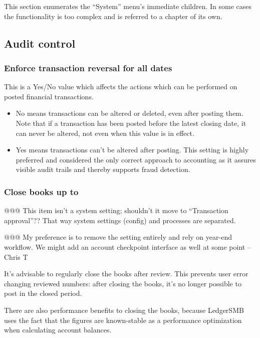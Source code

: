 This section enumerates the ``System'' menu's immediate children. In some cases the
functionality is too complex and is referred to a chapter of its own.

\subsection{Audit control}
\label{subsec-company-config-audit-control}

\subsubsection{Enforce transaction reversal for all dates}
\label{subsubsec-company-config-audit-control-reversals}


This is a Yes/No value which affects the actions which can be performed on posted financial transactions.
\begin{itemize}
\item No means transactions can be altered or deleted, even after posting them. Note that
if a transaction has been posted before the latest closing date, it can never be altered,
not even when this value is in effect.
\item Yes means transactions can't be altered after posting. This setting is highly preferred and considered the only correct approach to accounting as it assures visible
audit trails and thereby supports fraud detection.
\end{itemize}

\subsubsection{Close books up to}
\label{subsubsec-company-config-audit-control-close-books}


@@@ This item isn't a system setting; shouldn't it move to ``Transaction approval''?? That way system settings (config) and processes are separated.

@@@ My preference is to remove the setting entirely and rely on year-end 
workflow.  We might add an account checkpoint interface as well at some point
--Chris T

It's advisable to regularly close the books after review. This prevents user error changing
reviewed numbers: after closing the books, it's no longer possible to post in the closed
period.

There are also performance benefits to closing the books, because LedgerSMB uses the
fact that the figures are known-stable as a performance optimization when calculating
account balances.

